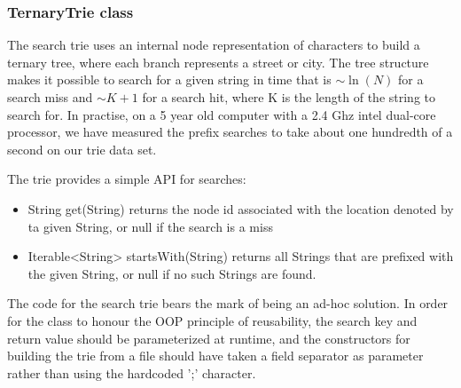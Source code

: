 \subsubsection{TernaryTrie class}
\label{sec:TernaryTrie class}
The search trie uses an internal node representation of characters to build a ternary tree, where each branch represents a street or city.
The tree structure makes it possible to search for a given string in time that is $\sim\ln(N)$ for a search miss and  $\sim K+1$ for a search hit, where K is the length of the string to search for.
In practise, on a 5 year old computer with a 2.4 Ghz intel dual-core processor, we have measured the prefix searches to take about one hundredth of a second on our trie data set.

The trie  provides a simple API for searches:
\begin{itemize}
	\item String get(String) returns the node id associated with the location denoted by ta given String, or null if the search is a miss
	\item Iterable<String> startsWith(String) returns all Strings that are prefixed with the given String, or null if no such Strings are found.
\end{itemize}

The code for the search trie bears the mark of being an ad-hoc solution. In order for the class to honour the OOP principle of reusability, the search key and return value should be parameterized at runtime, and the constructors for building the trie from a file should have taken a field separator as parameter rather than using the hardcoded ';' character.
